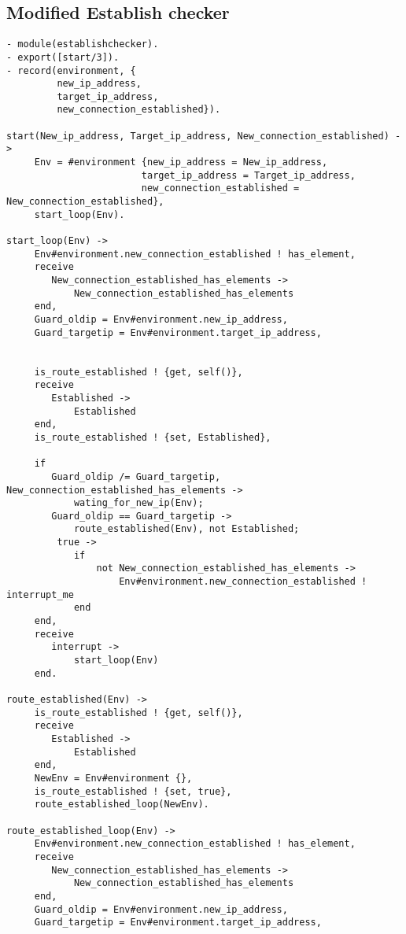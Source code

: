 \subsection*{Modified Establish checker}

\footnotesize
\begin{verbatim}
- module(establishchecker).
- export([start/3]).
- record(environment, {
         new_ip_address,
         target_ip_address,
         new_connection_established}).

start(New_ip_address, Target_ip_address, New_connection_established) -> 
     Env = #environment {new_ip_address = New_ip_address, 
                        target_ip_address = Target_ip_address,
                        new_connection_established = New_connection_established},
     start_loop(Env).

start_loop(Env) -> 
     Env#environment.new_connection_established ! has_element,
     receive 
        New_connection_established_has_elements -> 
            New_connection_established_has_elements
     end,
     Guard_oldip = Env#environment.new_ip_address,
     Guard_targetip = Env#environment.target_ip_address,


     is_route_established ! {get, self()},
     receive 
        Established -> 
            Established
     end,
     is_route_established ! {set, Established},
          
     if
        Guard_oldip /= Guard_targetip, New_connection_established_has_elements ->
            wating_for_new_ip(Env);
        Guard_oldip == Guard_targetip ->
            route_established(Env), not Established;
         true ->
            if
                not New_connection_established_has_elements ->
                    Env#environment.new_connection_established ! interrupt_me
            end
     end,
     receive 
        interrupt -> 
            start_loop(Env)
     end.
 
route_established(Env) -> 
     is_route_established ! {get, self()},
     receive 
        Established -> 
            Established
     end,
     NewEnv = Env#environment {},
     is_route_established ! {set, true},
     route_established_loop(NewEnv).

route_established_loop(Env) -> 
     Env#environment.new_connection_established ! has_element,
     receive 
        New_connection_established_has_elements -> 
            New_connection_established_has_elements
     end,
     Guard_oldip = Env#environment.new_ip_address,
     Guard_targetip = Env#environment.target_ip_address,
     

\end{verbatim}
